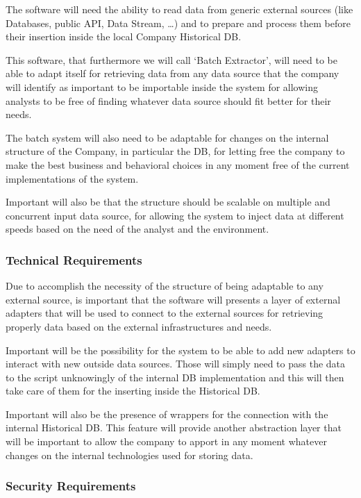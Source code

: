 The software will need the ability to read data from generic external sources (like Databases, public API, Data Stream, …) and to prepare and process them before their insertion inside the local Company Historical DB.

This software, that furthermore we will call ‘Batch Extractor’, will need to be able to adapt itself for retrieving data from any data source that the company will identify as important to be importable inside the system for allowing analysts to be free of finding whatever data source should fit better for their needs.

The batch system will also need to be adaptable for changes on the internal structure of the Company, in particular the DB, for letting free the company to make the best business and behavioral choices in any moment free of the current implementations of the system.

Important will also be that the structure should be scalable on multiple and concurrent input data source, for allowing the system to inject data at different speeds based on the need of the analyst and the environment.

\subsubsection{Technical Requirements}

Due to accomplish the necessity of the structure of being adaptable to any external source, is important that the software will presents a layer of external adapters that will be used to connect to the external sources for retrieving properly data based on the external infrastructures and needs. 

Important will be the possibility for the system to be able to add new adapters to interact with new outside data sources. Those will simply need to pass the data to the script unknowingly of the internal DB implementation and this will then take care of them for the inserting inside the Historical DB.

Important will also be the presence of wrappers for the connection with the internal Historical DB. 
This feature will provide another abstraction layer that will be important to allow the company to apport in any moment whatever changes on the internal technologies used for storing data.

\subsubsection{Security Requirements}

